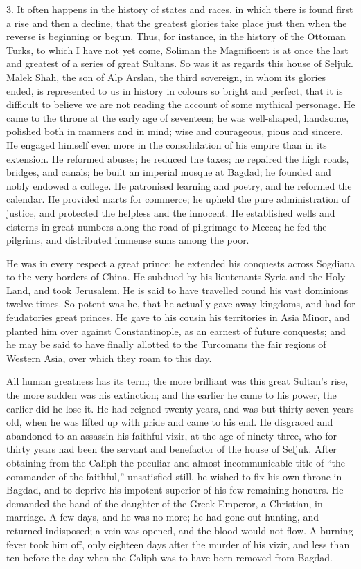 3. It often happens in the
history of states and races, in which there is found first a rise and
then a decline, that the greatest glories take place just then when
the reverse is beginning or begun. Thus, for instance, in the history
of the Ottoman Turks, to which I have not yet come, Soliman the
Magnificent is at once the last and greatest of a series of great
Sultans. So was it as regards this house of Seljuk. Malek Shah, the
son of Alp Arslan, the third sovereign, in whom its glories ended, is
represented to us in history in colours so bright and perfect, that it
is difficult to believe we are not reading the account of some
mythical personage. He came to the throne at the early age of
seventeen; he was well-shaped, handsome, polished both in manners and
in mind; wise and courageous, pious and sincere. He engaged himself
even more in the consolidation of his empire than in its extension. He
reformed abuses; he reduced the taxes; he repaired the high roads,
bridges, and canals; he built an imperial mosque at Bagdad; he founded
and nobly endowed a college. He patronised learning and poetry, and he
reformed the calendar. He provided marts for commerce; he upheld the
pure administration of justice, and protected the helpless and the
innocent. He established wells and cisterns in great numbers along the
road of pilgrimage to Mecca; he fed the pilgrims, and distributed
immense sums among the poor.

He was in every respect a
great prince; he extended his conquests across Sogdiana to the very
borders of China. He subdued by his lieutenants Syria and the Holy
Land, and took Jerusalem. He is said to have travelled round his vast
dominions twelve times. So potent was he, that he actually gave away
kingdoms, and had for feudatories great princes. He gave to his cousin
his territories in Asia Minor, and planted him over against
Constantinople, as an earnest of future conquests; and he may be said
to have finally allotted to the Turcomans the fair regions of Western
Asia, over which they roam to this day.

All human greatness has its
term; the more brilliant was this great Sultan's rise, the more sudden
was his extinction; and the earlier he came to his power, the earlier
did he lose it. He had reigned twenty years, and was but thirty-seven
years old, when he was lifted up with pride and came to his end. He
disgraced and abandoned to an assassin his faithful vizir, at the age
of ninety-three, who for thirty years had been the servant and
benefactor of the house of Seljuk. After obtaining from the Caliph the
peculiar and almost incommunicable title of ``the commander of the
faithful,'' unsatisfied still, he wished to fix his own throne in
Bagdad, and to deprive his impotent superior of his few remaining
honours. He demanded the hand of the daughter of the Greek Emperor, a
Christian, in marriage. A few days, and he was no more; he had gone
out hunting, and returned indisposed; a vein was opened, and the blood
would not flow. A burning fever took him off, only eighteen days after
the murder of his vizir, and less than ten before the day when the
Caliph was to have been removed from Bagdad.

